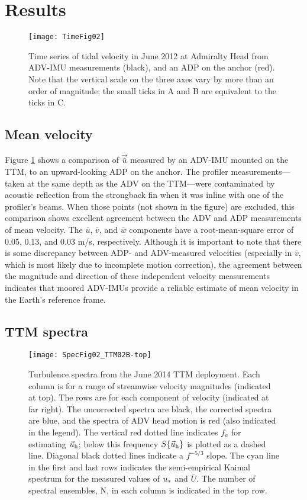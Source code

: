 \section{Results}
\label{sec:results}

\begin{figure}[t]
  \centering
  \texttt{[image: TimeFig02]}
  \caption{Time series of tidal velocity in June 2012 at Admiralty Head from ADV-IMU measurements (black), and an ADP on the anchor (red). Note that the vertical scale on the three axes vary by more than an order of magnitude; the small ticks in A and B are equivalent to the ticks in C.}
  \label{fig:vel_time}
\end{figure}

\subsection{Mean velocity}

Figure \ref{fig:vel_time} shows a comparison of $\vec{\bar u}$ measured by an ADV-IMU mounted on the TTM, to an upward-looking ADP on the anchor. The profiler measurements---taken at the same depth as the ADV on the TTM---were contaminated by acoustic reflection from the strongback fin when it was inline with one of the profiler's beams. When those points (not shown in the figure) are excluded, this comparison shows excellent agreement between the ADV and ADP measurements of mean velocity. The $\bar u$, $\bar v$, and $\bar w$ components have a root-mean-square error of 0.05, 0.13, and 0.03 m/s, respectively. Although it is important to note that there is some discrepancy between ADP- and ADV-measured velocities (especially in $\bar v$, which is most likely due to incomplete motion correction), the agreement between the magnitude and direction of these independent velocity measurements indicates that moored ADV-IMUs provide a reliable estimate of mean velocity in the Earth's reference frame.

\subsection{TTM spectra}

\begin{figure*}[t]
  \centering
  \texttt{[image: SpecFig02\_TTM02B-top]}
  \caption{Turbulence spectra from the June 2014 TTM deployment. Each column is for a range of streamwise velocity magnitudes (indicated at top). The rows are for each component of velocity (indicated at far right). The uncorrected spectra are black, the corrected spectra are blue, and the spectra of ADV head motion is red (also indicated in the legend). The vertical red dotted line indicates $f_a$ for estimating $\vec{u}_{\mathrm{h}}$; below this frequency $S\{\vec{u}_{\mathrm{h}}\}$ is plotted as a dashed line.   Diagonal black dotted lines indicate a $f^{-5/3}$ slope. The cyan line in the first and last rows indicates the semi-empirical Kaimal spectrum for the measured values of $u_*$ and $\bar U$. The number of spectral ensembles, N, in each column is indicated in the top row.}
  \label{fig:spec:ttm}
\end{figure*}

